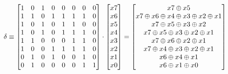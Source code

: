 \begin{equation}
\delta \equiv \begin{bmatrix}
1  & 0  & 1  & 0  & 0  & 0  & 0  & 0 \\
1  & 1  & 0  & 1  & 1  & 1  & 1  & 0  \\ 
1  & 0  & 1  & 0  & 1  & 1  & 0  & 0  \\
1  & 0  & 1  & 0  & 1  & 1  & 1  & 0  \\
1  & 1  & 0  & 0  & 0  & 1  & 1  & 0  \\
1  & 0  & 0  & 1  & 1  & 1  & 1  & 0  \\
0  & 1  & 0  & 1  & 0  & 0  & 1  & 0  \\
0  & 1  & 0  & 0  & 0  & 0  & 1  & 1  \\
\end{bmatrix}
\cdot
\begin{bmatrix}
x7 \\ x6 \\ x5 \\ x4 \\ x3 \\ x2 \\ x1 \\ x0 \\ 
\end{bmatrix}
=
\begin{bmatrix}
x7\oplus x5  \\
x7\oplus x6\oplus x4\oplus x3\oplus x2\oplus x1 \\
x7\oplus x5\oplus x3\oplus x2 \\
x7\oplus x5\oplus x3\oplus x2\oplus x1 \\
x7\oplus x6\oplus x2\oplus x1 \\
x7\oplus x4\oplus x3\oplus x2\oplus x1 \\
x6\oplus x4\oplus x1 \\
x6\oplus x1\oplus x0 \\
\end{bmatrix}
\\\\
\end{equation}


